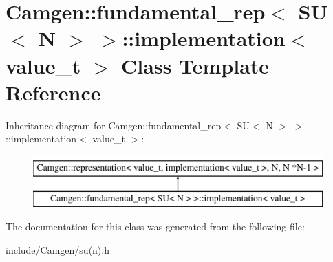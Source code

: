 \hypertarget{a00290}{}\section{Camgen\+:\+:fundamental\+\_\+rep$<$ S\+U$<$ N $>$ $>$\+:\+:implementation$<$ value\+\_\+t $>$ Class Template Reference}
\label{a00290}
Inheritance diagram for Camgen\+:\+:fundamental\+\_\+rep$<$ S\+U$<$ N $>$ $>$\+:\+:implementation$<$ value\+\_\+t $>$\+:\begin{figure}[H]
\begin{center}
\leavevmode
\includegraphics[height=2.000000cm]{a00290}
\end{center}
\end{figure}


The documentation for this class was generated from the following file\+:\begin{DoxyCompactItemize}
\item 
include/\+Camgen/su(n).\+h\end{DoxyCompactItemize}
